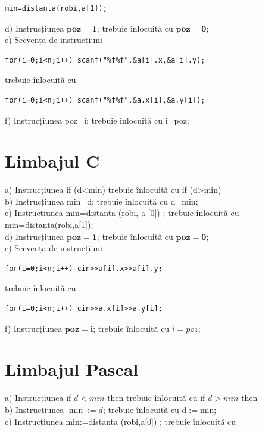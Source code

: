\documentclass[10pt]{article}
\begin{document}
\begin{verbatim}
min=distanta(robi,a[1]);
\end{verbatim}

d) Instrucțiunea $\mathbf{p o z = 1}$; trebuie înlocuită cu $\mathbf{p o z = 0 ; ~}$\\
e) Secvența de instrucțiuni

\begin{verbatim}
for(i=0;i<n;i++) scanf("%f%f",&a[i].x,&a[i].y);
\end{verbatim}

trebuie înlocuită cu

\begin{verbatim}
for(i=0;i<n;i++) scanf("%f%f",&a.x[i],&a.y[i]);
\end{verbatim}

f) Instrucțiunea poz=i; trebuie înlocuită cu i=poz;

\section*{Limbajul C}
a) Instrucțiunea if (d<min) trebuie înlocuită cu if (d>min)\\
b) Instrucțiunea min=d; trebuie înlocuită cu d=min;\\[0pt]
c) Instrucțiunea min=distanta (robi, a [0]) ; trebuie înlocuită cu min=distanta(robi,a[1]);\\
d) Instrucțiunea $\mathbf{p o z = 1}$; trebuie înlocuită cu $\mathbf{p o z = 0 ; ~}$\\
e) Secvența de instrucțiuni

\begin{verbatim}
for(i=0;i<n;i++) cin>>a[i].x>>a[i].y;
\end{verbatim}

trebuie înlocuită cu

\begin{verbatim}
for(i=0;i<n;i++) cin>>a.x[i]>>a.y[i];
\end{verbatim}

f) Instrucțiunea $\mathbf{p o z = i}$; trebuie înlocuită cu $i=p o z$;

\section*{Limbajul Pascal}
a) Instrucțiunea if $d<m i n$ then trebuie înlocuită cu if $d>m i n$ then\\
b) Instrucțiunea $\min :=d$; trebuie înlocuită cu $\mathrm{d}:=\mathrm{min}$;\\[0pt]
c) Instrucțiunea min:=distanta (robi,a[0]) ; trebuie înlocuită cu
\end{document}
